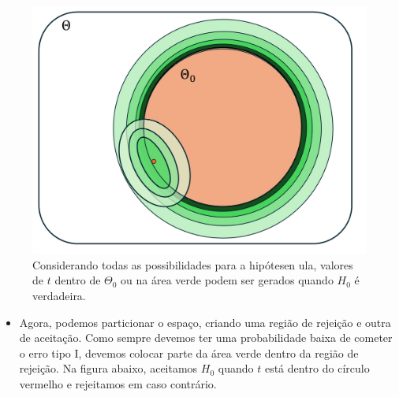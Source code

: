 \documentclass[
  letterpaper,
  DIV=11,
  numbers=noendperiod]{scrartcl}
\providecommand{\tightlist}{%
  \setlength{\itemsep}{0pt}\setlength{\parskip}{0pt}}\usepackage{longtable,booktabs,array}
\begin{document}
\begin{figure}

{\centering \includegraphics{fig_testD.jpg}

}

\caption{Considerando todas as possibilidades para a hipótesen ula,
valores de \(t\) dentro de \(\Theta_0\) ou na área verde podem ser
gerados quando \(H_0\) é verdadeira.}

\end{figure}%

\begin{itemize}
\tightlist
\item
  Agora, podemos particionar o espaço, criando uma região de rejeição e
  outra de aceitação. Como sempre devemos ter uma probabilidade baixa de
  cometer o erro tipo I, devemos colocar parte da área verde dentro da
  região de rejeição. Na figura abaixo, aceitamos \(H_0\) quando \(t\)
  está dentro do círculo vermelho e rejeitamos em caso contrário.
\end{itemize}
\end{document}
